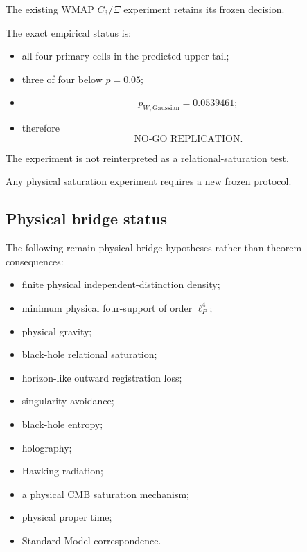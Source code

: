 The existing WMAP \(C_3/\Xi\) experiment retains its frozen decision.

The exact empirical status is:

\begin{itemize}

\item all four primary cells in the predicted upper tail;

\item three of four below \(p=0.05\);

\item
\[
p_{W,\mathrm{Gaussian}}=0.0539461;
\]

\item therefore
\[
\text{NO-GO REPLICATION}.
\]

\end{itemize}

The experiment is not reinterpreted as a relational-saturation test.

Any physical saturation experiment requires a new frozen protocol.

\subsection{Physical bridge status}

The following remain physical bridge hypotheses rather than theorem
consequences:

\begin{itemize}

\item finite physical independent-distinction density;

\item minimum physical four-support of order \(\ell_P^4\);

\item physical gravity;

\item black-hole relational saturation;

\item horizon-like outward registration loss;

\item singularity avoidance;

\item black-hole entropy;

\item holography;

\item Hawking radiation;

\item a physical CMB saturation mechanism;

\item physical proper time;

\item Standard Model correspondence.

\end{itemize}

